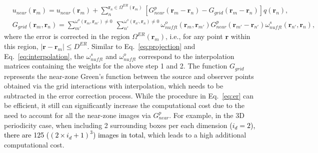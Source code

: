 \documentclass{article}
\begin{document}
\begin{subequations} \label{eq:er}
    \begin{align}
        &u_{near}(\mathbf{r}_m) = u_{near}(\mathbf{r}_m) + \sum_{n}^{\mathbf{r}_n \in \Omega^{ER}(\mathbf{r}_m)}[G^p_{near}(\mathbf{r}_m-\mathbf{r}_n) - G_{grid}(\mathbf{r}_m- \mathbf{r}_n)]q(\mathbf{r}_n), \label{eq:er_1}\\
        &G_{grid}(\mathbf{r}_m, \mathbf{r}_n) = \sum_{m'}^{\omega^o(\mathbf{r}_m,\mathbf{r}_{m'})\neq 0}\:\sum_{n'}^{\omega^s(\mathbf{r}_{n'},\mathbf{r}_n)\neq0}\omega^o_{nufft}(\mathbf{r}_m,\mathbf{r}_{m'})G^p_{near}(\mathbf{r}_{m'}- \mathbf{r}_{n'})\omega^s_{nufft}(\mathbf{r}_{n'},\mathbf{r}_n), \label{eq:er_2}
    \end{align}
\end{subequations}
where the error is corrected in the region $\Omega^{ER}(\mathbf{r}_m)$, i.e., for any point $\mathbf{r}$ within this region, $|\mathbf{r}-\mathbf{r}_m| \leq D^{ER}$. Similar to Eq.~\eqref{eq:projection} and Eq.~\eqref{eq:interpolation}, the $\omega^s_{nufft}$ and $\omega^o_{nufft}$ correspond to the interpolation matrices containing the weights for the above step 1 and 2. The function $G_{grid}$ represents the near-zone Green's function between the source and observer points obtained via the grid interactions with interpolation, which needs to be subtracted in the error correction process.
While the procedure in Eq.~\eqref{eq:er} can be efficient, it still can significantly increase the computational cost due to the need to account for all the near-zone images via $G^p_{near}$. For example, in the 3D periodicity case, when including 2 surrounding boxes per each dimension \textcolor{black}{($i_d=2$), there are 125 ($(2\times i_d+1)^3$) images in total}, which leads to a high additional computational cost. 
\end{document}
